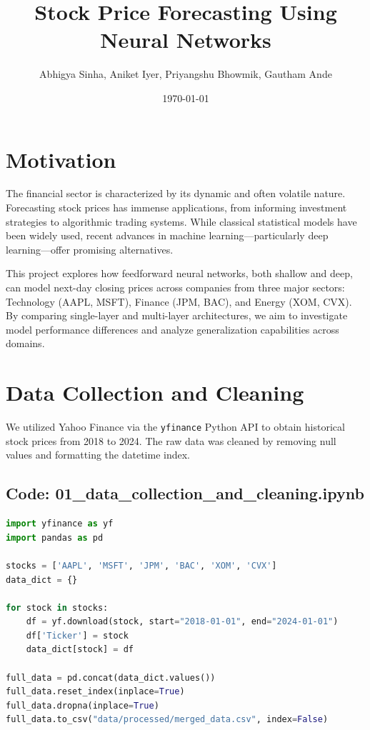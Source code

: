 \documentclass[12pt]{article}
\title{Stock Price Forecasting Using Neural Networks}
\author{Abhigya Sinha, Aniket Iyer, Priyangshu Bhowmik, Gautham Ande}
\date{\today}
\begin{document}
\maketitle

\tableofcontents
\newpage

\section{Motivation}
The financial sector is characterized by its dynamic and often volatile nature. Forecasting stock prices has immense applications, from informing investment strategies to algorithmic trading systems. While classical statistical models have been widely used, recent advances in machine learning—particularly deep learning—offer promising alternatives. 

This project explores how feedforward neural networks, both shallow and deep, can model next-day closing prices across companies from three major sectors: Technology (AAPL, MSFT), Finance (JPM, BAC), and Energy (XOM, CVX). By comparing single-layer and multi-layer architectures, we aim to investigate model performance differences and analyze generalization capabilities across domains.

\section{Data Collection and Cleaning}
We utilized Yahoo Finance via the \texttt{yfinance} Python API to obtain historical stock prices from 2018 to 2024. The raw data was cleaned by removing null values and formatting the datetime index.

\subsection*{Code: 01\_data\_collection\_and\_cleaning.ipynb}
\begin{lstlisting}[language=Python]
import yfinance as yf
import pandas as pd

stocks = ['AAPL', 'MSFT', 'JPM', 'BAC', 'XOM', 'CVX']
data_dict = {}

for stock in stocks:
    df = yf.download(stock, start="2018-01-01", end="2024-01-01")
    df['Ticker'] = stock
    data_dict[stock] = df

full_data = pd.concat(data_dict.values())
full_data.reset_index(inplace=True)
full_data.dropna(inplace=True)
full_data.to_csv("data/processed/merged_data.csv", index=False)
\end{lstlisting}
\end{document}
